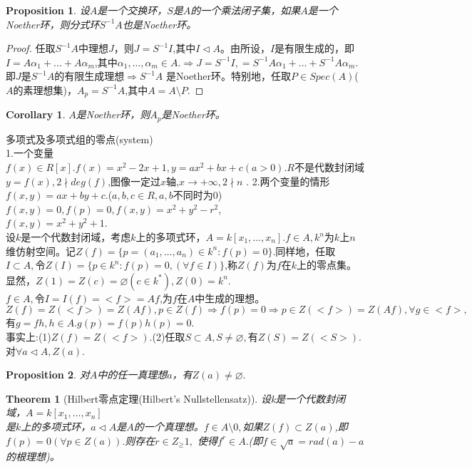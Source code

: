 \documentclass[UTF8]{article}
\newtheorem{thm}{Theorem}[section]
\newtheorem{cor}{Corollary}[section]
\newtheorem{prop}{Proposition}[section]
\begin{document}
\begin{prop}
	设$A$是一个交换环，$S$是$A$的一个乘法闭子集，如果$A$是一个Noether环，则分式环$S^{-1}A$也是Noether环。
\end{prop}
\begin{proof}
	任取$S^{-1}A$中理想$J$，则$J=S^{-1}I$,其中$I\vartriangleleft  A$。由所设，$I$是有限生成的，即$I=A\alpha_1+\ldots+A\alpha_m$,其中$\alpha_1,\ldots,\alpha_m\in A.\Rightarrow J=S^{-1}I,=S^{-1}A\alpha_1+\ldots+S^{-1}A\alpha_m$.即$J$是$S^{-1}A$的有限生成理想$\Rightarrow S^{-1}A$ 是Noether环。特别地，任取$P\in Spec(A)$($A$的素理想集)，$A_p=S^{-1}A$,其中$A=A\setminus P$.
\end{proof}
\begin{cor}
	$A$是Noether环，则$A_p$是Noether环。
\end{cor}
多项式及多项式组的零点(system)\\
1.一个变量\\
$f(x)\in R[x].f(x)=x^2-2x+1,y=ax^2+bx+c(a>0)$.$R$不是代数封闭域\\
$y=f(x),2\nmid deg(f)$,图像一定过$x$轴,$x\rightarrow +\infty,2\nmid n$ .
2.两个变量的情形\\
$f(x,y)=ax+by+c$.($a,b,c\in R,a,b$不同时为$0$)
$f(x,y)=0,f(p)=0,f(x,y)=x^2+y^2-r^2$,\\
$f(x,y)=x^2+y^2+1$.\\
设$k$是一个代数封闭域，考虑$k$上的多项式环，$A=k[x_1,\ldots,x_n].f\in A,k^n$为$k$上$n$维仿射空间。记$Z(f)=\{p=(a_1,\ldots,a_n)\in k^n:f(p)=0\}$.同样地，任取$I\subset A,令Z(I)=\{p\in k^n:f(p)=0,(\forall f\in I)\}$,称$Z(f)$为$f$在$k$上的零点集。显然，$Z(1)=Z(c)=\varnothing(c\in k^*),Z(0)=k^n.$\\
$f\in A,$令$I=I(f)=<f>=Af$,为$f$在$A$中生成的理想。$Z(f)=Z(<f>)=Z(Af),p\in Z(f)\Rightarrow f(p)=0\Rightarrow p\in Z(<f>)=Z(Af),\forall g\in <f>,$有$g=fh,h\in A.g(p)=f(p)h(p)=0.$\\
事实上:(1)$Z(f)=Z(<f>)$.(2)任取$S\subset A,S\neq \varnothing,$有$Z(S)=Z(<S>).$\\
对$\forall a\vartriangleleft A,Z(a).$\\
\begin{prop}
	对$A$中的任一真理想$a$，有$Z(a)\neq \varnothing.$
\end{prop}
\begin{thm}[Hilbert零点定理(Hilbert's Nullstellensatz)]
	设k是一个代数封闭域，$A=k[x_1,\ldots,x_n]$\\
	是$k$上的多项式环，$a\vartriangleleft A$是$A$的一个真理想。$f\in A\setminus 0,$如果$Z(f)\subset Z(a)$,即$f(p)=0(\forall p\in Z(a)).$则存在$r\in Z_\geqslant1,$ 使得$f^r\in A.$(即$f\in\sqrt{a}=rad(a)-a$的根理想)。
\end{thm}
\end{document}
